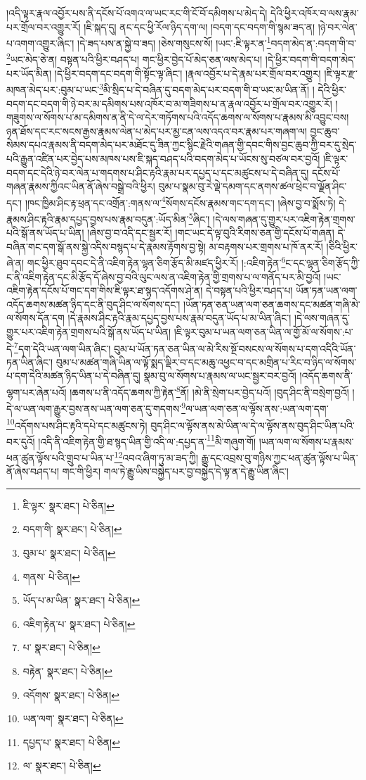 །འདི་ལྟར་རྣལ་འབྱོར་པས་ནི་དངོས་པོ་འགའ་ལ་ཡང་རང་གི་ངོ་བོ་དམིགས་པ་མེད་དེ། དེའི་ཕྱིར་འཁོར་བ་ལས་རྣམ་པར་གྲོལ་བར་འགྱུར་རོ། །ཇི་སྐད་དུ། ནང་དང་ཕྱི་རོལ་ཉིད་དག་ལ། །བདག་དང་བདག་གི་སྙམ་ཟད་ན། །ཉེ་བར་ལེན་པ་འགག་འགྱུར་ཞིང་། །དེ་ཟད་པས་ན་སྐྱེ་བ་ཟད། །ཅེས་གསུངས་སོ། །ཡང་:ཇི་ལྟར་ན་\footnote{ཇི་ལྟར་  སྣར་ཐང་།  པེ་ཅིན། }བདག་མེད་ན་:བདག་གི་བ་\footnote{བདག་གི་  སྣར་ཐང་།  པེ་ཅིན། }ཡང་མེད་ཅེ་ན། བསྟན་པའི་ཕྱིར་བཤད་པ། གང་ཕྱིར་བྱེད་པོ་མེད་ཅན་ལས་མེད་པ། །དེ་ཕྱིར་བདག་གི་བདག་མེད་པར་ཡོད་མིན། །དེ་ཕྱིར་བདག་དང་བདག་གི་སྟོང་ལྟ་ཞིང་། །རྣལ་འབྱོར་པ་དེ་རྣམ་པར་གྲོལ་བར་འགྱུར། །ཇི་ལྟར་རྫ་མཁན་མེད་པར་:བུམ་པ་ཡང་\footnote{བུམ་པ་  སྣར་ཐང་།  པེ་ཅིན། }མི་སྲིད་པ་དེ་བཞིན་དུ་བདག་མེད་པར་བདག་གི་བ་ཡང་མ་ཡིན་ནོ། །
དེའི་ཕྱིར་བདག་དང་བདག་གི་ཉེ་བར་མ་དམིགས་པས་འཁོར་བ་མ་གཟིགས་པ་ན་རྣལ་འབྱོར་པ་གྲོལ་བར་འགྱུར་རོ། །གཟུགས་ལ་སོགས་པ་མ་དམིགས་ན་ནི་དེ་ལ་དེར་གཏོགས་པའི་འདོད་ཆགས་ལ་སོགས་པ་རྣམས་མི་འབྱུང་བས། ཉན་ཐོས་དང་རང་སངས་རྒྱས་རྣམས་ལེན་པ་མེད་པར་མྱ་ངན་ལས་འདའ་བར་རྣམ་པར་གཞག་ལ། བྱང་ཆུབ་སེམས་དཔའ་རྣམས་ནི་བདག་མེད་པར་མཐོང་དུ་ཟིན་ཀྱང་སྙིང་རྗེའི་གཞན་གྱི་དབང་གིས་བྱང་ཆུབ་ཀྱི་བར་དུ་སྲེད་པའི་རྒྱུན་འཛིན་པར་བྱེད་པས་མཁས་པས་ཇི་སྐད་བཤད་པའི་བདག་མེད་པ་ཡོངས་སུ་བཙལ་བར་བྱའོ། །ཇི་ལྟར་བདག་དང་དེའི་ཉེ་བར་ལེན་པ་གདགས་པ་ཤིང་རྟའི་རྣམ་པར་དཔྱད་པ་དང་མཚུངས་པ་དེ་བཞིན་དུ། དངོས་པོ་གཞན་རྣམས་ཀྱིའང་ཡིན་ནོ་ཞེས་བསྒྲེ་བའི་ཕྱིར། བུམ་པ་སྣམ་བུ་རེ་ལྡེ་དམག་དང་ནགས་ཚལ་ཕྲེང་བ་ལྗོན་ཤིང་དང་། །ཁང་ཁྱིམ་ཤིང་རྟ་ཕྲན་དང་འགྲོན་:གནས་ལ་\footnote{གནས་  པེ་ཅིན། }སོགས་དངོས་རྣམས་གང་དག་དང་། །ཞེས་བྱ་བ་སྨོས་ཏེ། དེ་རྣམས་ཤིང་རྟའི་རྣམ་དཔྱད་བྱས་པས་རྣམ་བདུན་:ཡོད་མིན་\footnote{ཡོད་པ་མ་ཡིན་  སྣར་ཐང་།  པེ་ཅིན། }ཞིང་། །དེ་ལས་གཞན་དུ་གྱུར་པར་འཇིག་རྟེན་གྲགས་པའི་སྒོ་ནས་ཡོད་པ་ཡིན། །ཞེས་བྱ་བ་འདི་དང་སྦྱར་རོ། །གང་ཡང་དེ་ལྟ་བུའི་རིགས་ཅན་གྱི་དངོས་པོ་གཞན། དེ་བཞིན་གང་དག་སྒོ་ནས་སྐྱེ་འདིས་བསྙད་པ་དེ་རྣམས་རྟོགས་བྱ་སྟེ། མ་བརྟགས་པར་གྲགས་པ་ཁོ་ནར་རོ། །ཅིའི་ཕྱིར་ཞེ་ན། གང་ཕྱིར་ཐུབ་དབང་དེ་ནི་འཇིག་རྟེན་ལྷན་ཅིག་རྩོད་མི་མཛད་ཕྱིར་རོ། །:འཇིག་རྟེན་\footnote{འཇིག་རྟེན་པ་  སྣར་ཐང་།  པེ་ཅིན། }ང་དང་ལྷན་ཅིག་རྩོད་ཀྱི་ང་ནི་འཇིག་རྟེན་དང་མི་རྩོད་དོ་ཞེས་བྱ་བའི་ལུང་ལས་ན་འཇིག་རྟེན་གྱི་གྲགས་པ་ལ་གནོད་པར་མི་བྱའོ། །ཡང་འཇིག་རྟེན་དངོས་པོ་གང་དག་གིས་ཇི་ལྟར་ཐ་སྙད་འདོགས་ཤེ་ན། དེ་བསྟན་པའི་ཕྱིར་བཤད་པ། ཡོན་ཏན་ཡན་ལག་འདོད་ཆགས་མཚན་ཉིད་དང་ནི་བུད་ཤིང་ལ་སོགས་དང་། །ཡོན་ཏན་ཅན་ཡན་ལག་ཅན་ཆགས་དང་མཚན་གཞི་མེ་ལ་སོགས་དོན་དག །དེ་རྣམས་ཤིང་རྟའི་རྣམ་དཔྱད་བྱས་པས་རྣམ་བདུན་ཡོད་པ་མ་ཡིན་ཞིང་། །དེ་ལས་གཞན་དུ་གྱུར་པར་འཇིག་རྟེན་གྲགས་པའི་སྒོ་ནས་ཡོད་པ་ཡིན། །ཇི་ལྟར་བུམ་པ་ཡན་ལག་ཅན་ཡིན་ལ་གྱོ་མོ་ལ་སོགས་:པ་དེ་\footnote{པ་  སྣར་ཐང་།  པེ་ཅིན། }དག་དེའི་ཡན་ལག་ཡིན་ཞིང་། བུམ་པ་ཡོན་ཏན་ཅན་ཡིན་ལ་མེ་རིས་སྔོ་བསངས་ལ་སོགས་པ་དག་འདིའི་ཡོན་ཏན་ཡིན་ཞིང་། བུམ་པ་མཚན་གཞི་ཡིན་ལ་ལྟོ་སྨད་ལྡིར་བ་དང་མཆུ་འཕྱང་བ་དང་མགྲིན་པ་རིང་བ་ཉིད་ལ་སོགས་པ་དག་དེའི་མཚན་ཉིད་ཡིན་པ་དེ་བཞིན་དུ། སྣམ་བུ་ལ་སོགས་པ་རྣམས་ལ་ཡང་སྦྱར་བར་བྱའོ། །འདོད་ཆགས་ནི་ལྷག་པར་ཞེན་པའོ། །ཆགས་པ་ནི་འདོད་ཆགས་ཀྱི་རྟེན་\footnote{བརྟེན་  སྣར་ཐང་།  པེ་ཅིན། }ནོ། །མེ་ནི་སྲེག་པར་བྱེད་པའོ། །བུད་ཤིང་ནི་བསྲེག་བྱའོ། །དེ་ལ་ཡན་ལག་རྒྱུར་བྱས་ནས་ཡན་ལག་ཅན་དུ་གདགས་\footnote{འདོགས་  སྣར་ཐང་།  པེ་ཅིན། }ལ་ཡན་ལག་ཅན་ལ་ལྟོས་ནས་:ཡན་ལག་དག་\footnote{ཡན་ལག་  སྣར་ཐང་།  པེ་ཅིན། }འདོགས་པས་ཤིང་རྟའི་དཔེ་དང་མཚུངས་ཏེ། བུད་ཤིང་ལ་ལྟོས་ནས་མེ་ཡིན་ལ་དེ་ལ་ལྟོས་ནས་བུད་ཤིང་ཡིན་པའི་བར་དུའོ། །འདི་ནི་འཇིག་རྟེན་གྱི་ཐ་སྙད་ཡིན་གྱི་འདི་ལ་:དཔྱད་ན་\footnote{དཔྱད་པ་  སྣར་ཐང་།  པེ་ཅིན། }མི་གཞུག་གོ། །ཡན་ལག་ལ་སོགས་པ་རྣམས་ཕན་ཚུན་ལྟོས་པའི་གྲུབ་པ་ཡིན་པ་\footnote{ལ་  སྣར་ཐང་།  པེ་ཅིན། }འབའ་ཞིག་ཏུ་མ་ཟད་ཀྱི། རྒྱུ་དང་འབྲས་བུ་གཉིས་ཀྱང་ཕན་ཚུན་ལྟོས་པ་ཡིན་ནོ་ཞེས་བཤད་པ། གང་གི་ཕྱིར། གལ་ཏེ་རྒྱུ་ཡིས་བསྐྱེད་པར་བྱ་བསྐྱེད་དེ་ལྟ་ན་དེ་རྒྱུ་ཡིན་ཞིང་། 